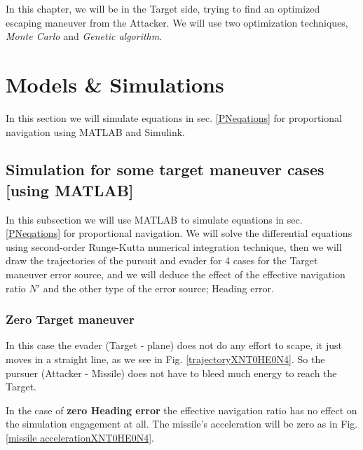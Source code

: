 \label{optimization_EM}

In this chapter, we will be in the Target side, trying  to find an optimized escaping maneuver from the Attacker. We will use two optimization techniques, \textit{Monte Carlo} and \textit{Genetic algorithm}.


\section{Models \& Simulations}

In this section we will simulate equations in sec. \ref{PNeqations} for proportional navigation using MATLAB and Simulink.



\subsection{Simulation for some target maneuver cases [using MATLAB]}
In this subsection we will use MATLAB to simulate equations in sec. \ref{PNeqations} for proportional navigation. We will solve the differential equations using second-order Runge-Kutta numerical integration technique, then we will draw the trajectories of the pursuit and evader for 4 cases for the Target maneuver error source, and we will deduce the effect of the effective navigation ratio $N'$ and the other type of the error source; Heading error. 
\subsubsection{Zero Target maneuver}
In this case the evader (Target - plane) does not do any effort to scape, it just moves in a straight line, as we see in Fig. \ref{trajectoryXNT0HE0N4}. So the pursuer (Attacker - Missile) does not have to bleed much energy to reach the Target.

In the case of \textbf{zero Heading error} the effective navigation ratio has no effect on the simulation engagement at all. The missile's acceleration will be zero as in Fig. \ref{missile accelerationXNT0HE0N4}.

